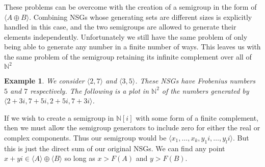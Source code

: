 \documentclass[11pt]{amsart}
\theoremstyle{plain}
\newtheorem{exa}{Example}
\theoremstyle{definition}
\begin{document}
These problems can be overcome with the  creation of a semigroup in the form of $\langle A\oplus B\rangle$. Combining NSGs whose generating sets are different sizes is explicitly handled in this case, and the two semigroups are allowed to generate their elements independently. Unfortunately we still have the same problem of only being able to generate any number in a finite number of ways. This leaves us with the same problem of the semigroup retaining its infinite complement over all of $\mathbb{N}^2$
\begin{exa}
We consider $\langle 2,7\rangle$ and $\langle 3,5\rangle$. These NSGs have Frobenius numbers $5$ and $7$ respectively\cite{frobmask}. The following is a plot in $\mathbb{N}^2$ of the numbers generated by $\langle 2+3i,7+5i,2+5i,7+3i\rangle$.

\begin{center}
\end{center}
\end{exa}
If we wish to create a semigroup in $\mathbb{N}[i]$ with some form of a finite complement, then we must allow the semigroup generators to include zero for either the real or complex components.
Thus our semigroup would be $\langle x_1,\dots,x_k,y_1i,\dots,y_li\rangle$.
But this is just the direct sum of our original NSGs.
We can find any point $x+yi\in \langle A\rangle\oplus \langle B\rangle$ so long as $x>F(A)$ and $y>F(B)$.
\end{document}

